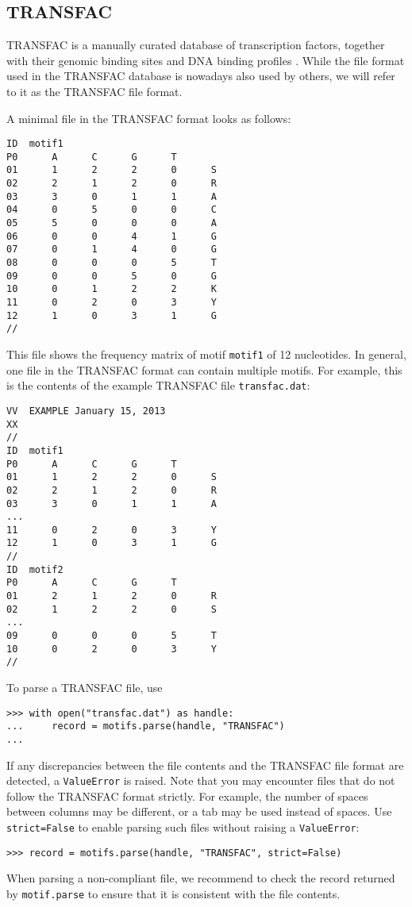 \subsection{TRANSFAC}

TRANSFAC is a manually curated database of transcription factors, together
with their genomic binding sites and DNA binding profiles \cite{matys2003}.
While the file format used in the TRANSFAC database is nowadays also used
by others, we will refer to it as the TRANSFAC file format.

A minimal file in the TRANSFAC format looks as follows:
\begin{verbatim}
ID  motif1
P0      A      C      G      T
01      1      2      2      0      S
02      2      1      2      0      R
03      3      0      1      1      A
04      0      5      0      0      C
05      5      0      0      0      A
06      0      0      4      1      G
07      0      1      4      0      G
08      0      0      0      5      T
09      0      0      5      0      G
10      0      1      2      2      K
11      0      2      0      3      Y
12      1      0      3      1      G
//
\end{verbatim}
This file shows the frequency matrix of motif \verb+motif1+ of 12 nucleotides.
In general, one file in the TRANSFAC format can contain multiple motifs. For
example, this is the contents of the example TRANSFAC file \verb+transfac.dat+:
\begin{verbatim}
VV  EXAMPLE January 15, 2013
XX
//
ID  motif1
P0      A      C      G      T
01      1      2      2      0      S
02      2      1      2      0      R
03      3      0      1      1      A
...
11      0      2      0      3      Y
12      1      0      3      1      G
//
ID  motif2
P0      A      C      G      T
01      2      1      2      0      R
02      1      2      2      0      S
...
09      0      0      0      5      T
10      0      2      0      3      Y
//
\end{verbatim}
To parse a TRANSFAC file, use
\begin{verbatim}
>>> with open("transfac.dat") as handle:
...     record = motifs.parse(handle, "TRANSFAC")
...
\end{verbatim}
If any discrepancies between the file contents and the TRANSFAC file format are detected, a \verb+ValueError+ is raised. Note that you may encounter files that do not follow the TRANSFAC format strictly. For example, the number of spaces between columns may be different, or a tab may be used instead of spaces. Use \verb+strict=False+ to enable parsing such files without raising a \verb+ValueError+:
\begin{verbatim}
>>> record = motifs.parse(handle, "TRANSFAC", strict=False)
\end{verbatim}
When parsing a non-compliant file, we recommend to check the record returned by \verb+motif.parse+ to ensure that it is consistent with the file contents.

